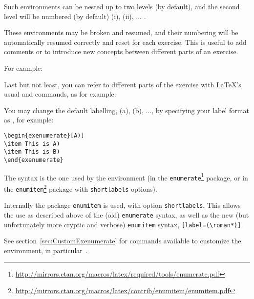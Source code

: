 \documentclass[11pt,a4paper]{article}
\begin{document}

Such  environments can be nested up to two levels (by default), and
the second level will be numbered (by default) (i), (ii), ... .

These environments may be broken and resumed, and their numbering will be automatically
resumed correctly and reset for each exercise. This is useful to add comments or to
introduce new concepts between different parts of an exercise.

For example:
\begin{pkgverbatim}
%
\end{pkgverbatim}

Last but not least, you can refer to different parts of the exercise with \LaTeX's usual
 and 
commands, as for example:
\begin{pkgverbatim}
%
\end{pkgverbatim}

You may change the default labelling, (a), (b), ..., by specifying your label format as
, for example:
\begin{pkgverbatim}
\begin{verbatim}
\begin{exenumerate}[A)]
\item This is A)
\item This is B)
\end{exenumerate}
\end{verbatim}
\end{pkgverbatim}
The syntax is the one used by the  environment (in the
\texttt{enumerate}\footnote{\url{http://mirrors.ctan.org/macros/latex/required/tools/enumerate.pdf}}
package, or in the
\texttt{enumitem}\footnote{\url{http://mirrors.ctan.org/macros/latex/contrib/enumitem/enumitem.pdf}}
package with \texttt{shortlabels} options).

\begin{pkgtip}
  Internally the package \texttt{enumitem} is used, with option \texttt{shortlabels}. This
  allows the use as described above of the (old) \texttt{enumerate} syntax, as well as the
  new (but unfortunately more cryptic and verbose) \texttt{enumitem} syntax,
  \texttt{[label=(\textbackslash roman*)]}.

  See section~\ref{sec:CustomExenumerate} for commands available to customize the
   environment, in particular~.
\end{pkgtip}
\end{document}
